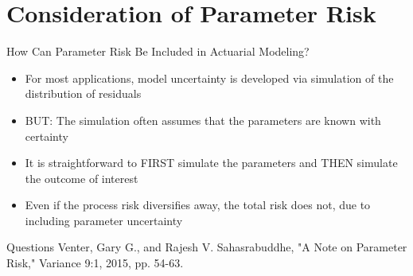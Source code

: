 \documentclass[10pt, xcolor=x11names,compress]{beamer}
\begin{document}
\section{Consideration of Parameter Risk}
\begin{frame}{How Can Parameter Risk Be Included in Actuarial Modeling?}
	\begin{itemize}
		\item<1-> For most applications, model uncertainty is developed via simulation of the distribution of residuals
		\item<2-> BUT: The simulation often assumes that the parameters are known with certainty
		\item<3-> It is straightforward to FIRST simulate the parameters and THEN simulate the outcome of interest
		\item<3-> Even if the process risk diversifies away, the total risk does not, due to including parameter uncertainty
	\end{itemize}
\end{frame}

\begin{frame}{Questions}
	Venter, Gary G., and Rajesh V. Sahasrabuddhe, "A Note on Parameter Risk," Variance 9:1, 2015, pp. 54-63.
\end{frame}
\end{document}

